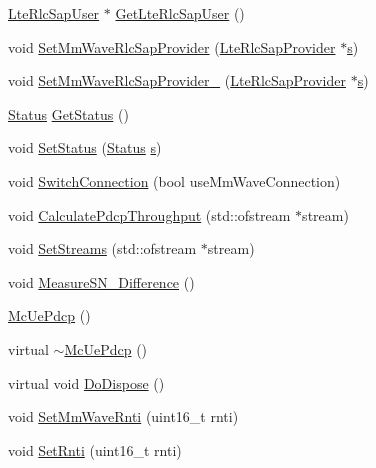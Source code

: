 \begin{DoxyCompactItemize}
\item 
\hyperlink{classns3_1_1LteRlcSapUser}{Lte\+Rlc\+Sap\+User} $\ast$ \hyperlink{classns3_1_1McUePdcp_a10453df9b647309d051a527667bfac7c}{Get\+Lte\+Rlc\+Sap\+User} ()
\item 
void \hyperlink{classns3_1_1McUePdcp_a2032aa0cb401b36e280e8db583a1cb3e}{Set\+Mm\+Wave\+Rlc\+Sap\+Provider} (\hyperlink{classns3_1_1LteRlcSapProvider}{Lte\+Rlc\+Sap\+Provider} $\ast$\hyperlink{generate__test__data__lte__sinr_8m_ad83eeb3a142285d1243a08c6b7026df8}{s})
\item 
void \hyperlink{classns3_1_1McUePdcp_adde40a45e06b72a2b3f685147b42e2ad}{Set\+Mm\+Wave\+Rlc\+Sap\+Provider\+\_} (\hyperlink{classns3_1_1LteRlcSapProvider}{Lte\+Rlc\+Sap\+Provider} $\ast$\hyperlink{generate__test__data__lte__sinr_8m_ad83eeb3a142285d1243a08c6b7026df8}{s})
\item 
\hyperlink{structns3_1_1McUePdcp_1_1Status}{Status} \hyperlink{classns3_1_1McUePdcp_af022d10d95b9236b8d35a48403a8158e}{Get\+Status} ()
\item 
void \hyperlink{classns3_1_1McUePdcp_a3db2f17d18b800a1a644364081d6a2a8}{Set\+Status} (\hyperlink{structns3_1_1McUePdcp_1_1Status}{Status} \hyperlink{generate__test__data__lte__sinr_8m_ad83eeb3a142285d1243a08c6b7026df8}{s})
\item 
void \hyperlink{classns3_1_1McUePdcp_ab2239d009721861c5d460c81fbe8da26}{Switch\+Connection} (bool use\+Mm\+Wave\+Connection)
\item 
void \hyperlink{classns3_1_1McUePdcp_ac3586f5dc45afc13156dcbec5ab6cac4}{Calculate\+Pdcp\+Throughput} (std\+::ofstream $\ast$stream)
\item 
void \hyperlink{classns3_1_1McUePdcp_ace0b344e4b821cb16ce9f1bcfa08112c}{Set\+Streams} (std\+::ofstream $\ast$stream)
\item 
void \hyperlink{classns3_1_1McUePdcp_aae72a344bdc2581f3a0fc3304fbf9bef}{Measure\+S\+N\+\_\+\+Difference} ()
\item 
\hyperlink{classns3_1_1McUePdcp_ac6e951fc0d0dcf2fcc88164f8e0044c4}{Mc\+Ue\+Pdcp} ()
\item 
virtual \hyperlink{classns3_1_1McUePdcp_aa337afe0aa8735094f73f9019732378f}{$\sim$\+Mc\+Ue\+Pdcp} ()
\item 
virtual void \hyperlink{classns3_1_1McUePdcp_a83ce102e66c06b28ba23121cec0d98fe}{Do\+Dispose} ()
\item 
void \hyperlink{classns3_1_1McUePdcp_a1a464393107fc57b060a6fc120208152}{Set\+Mm\+Wave\+Rnti} (uint16\+\_\+t rnti)
\item 
void \hyperlink{classns3_1_1McUePdcp_a1d597252cb902334c3c1d11907df0254}{Set\+Rnti} (uint16\+\_\+t rnti)

\end{DoxyCompactItemize}
